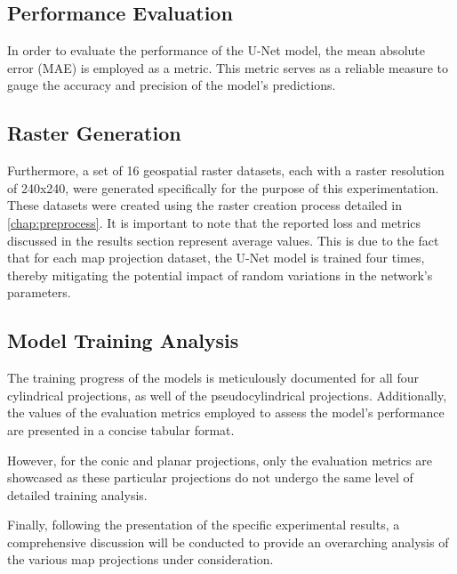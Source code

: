 \subsection{Performance Evaluation}
In order to evaluate the performance of the U-Net model, the mean absolute error (MAE) is employed as a metric. This metric serves as a reliable measure to gauge
the accuracy and precision of the model's predictions.
\subsection{Raster Generation}
Furthermore, a set of 16 geospatial raster datasets, each with a raster resolution of 240x240, were generated specifically for the purpose of this experimentation.
These datasets were created using the raster creation process detailed in \autoref{chap:preprocess}. It is important to note that the reported loss and metrics discussed
in the results section represent average values. This is due to the fact that for each map projection dataset, the U-Net model is trained four times, thereby mitigating
the potential impact of random variations in the network's parameters.
\subsection{Model Training Analysis}
The training progress of the models is meticulously documented for all four cylindrical projections, as well of the pseudocylindrical projections.
Additionally, the values of the evaluation metrics employed to assess the model's performance are presented in a concise tabular format.

However, for the conic and planar projections, only the evaluation metrics are showcased as these particular projections do not undergo the same level of detailed training
analysis.

Finally, following the presentation of the specific experimental results, a comprehensive discussion will be conducted to provide an overarching analysis of the
various map projections under consideration.

\clearpage

\clearpage

\clearpage


\clearpage


